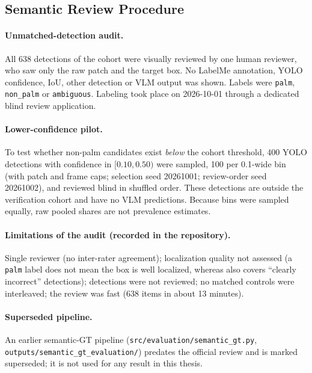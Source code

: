 \subsection{Semantic Review Procedure}
\label{sec:method:semantic}
\paragraph{Unmatched-detection audit.} All 638 \unmatched{} detections of the
cohort were visually reviewed by one human reviewer, who saw only the raw patch
and the target box. No LabelMe annotation, YOLO confidence, IoU, other detection
or VLM output was shown. Labels were \texttt{palm}, \texttt{non\_palm} or
\texttt{ambiguous}. Labeling took place on 2026-10-01 through a dedicated blind
review application.

\paragraph{Lower-confidence pilot.} To test whether non-palm candidates exist
\emph{below} the cohort threshold, 400 YOLO detections with confidence in
$[0.10, 0.50)$ were sampled, 100 per 0.1-wide bin (with patch and frame caps;
selection seed 20261001; review-order seed 20261002), and reviewed blind in
shuffled order. These detections are outside the verification cohort and have
no VLM predictions. Because bins were sampled equally, raw pooled shares are not
prevalence estimates.

\paragraph{Limitations of the audit (recorded in the repository).} Single
reviewer (no inter-rater agreement); localization quality not assessed (a
\texttt{palm} label does not mean the box is well localized, whereas \Ur{} also
covers ``clearly incorrect'' detections); \matched{} detections were not
reviewed; no matched controls were interleaved; the review was fast (638 items in
about 13 minutes).

\paragraph{Superseded pipeline.} An earlier semantic-GT pipeline
(\texttt{src/evaluation/semantic\_gt.py},
\texttt{outputs/semantic\_gt\_evaluation/}) predates the official review and is
marked superseded; it is not used for any result in this thesis.
